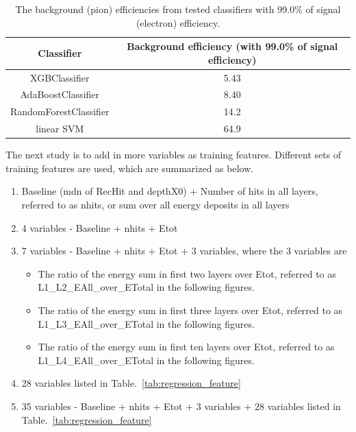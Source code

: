 \begin{table}[!ht]
  \begin{center}
    {
    \begin{tabular}{cc}
    	Classifier &  Background efficiency (with 99.0\% of signal efficiency) \\
    	\hline
    	XGBClassifier & 5.43 \\
    	AdaBoostClassifier  & 8.40 \\
    	RandomForestClassifier & 14.2 \\
    	linear SVM & 64.9 \\
    \end{tabular}
    }
  \end{center}
  \caption{The background (pion) efficiencies from tested classifiers with 99.0\% of signal (electron) efficiency.  \label{tab:ROC-summary}}
\end{table}


The next study is to add in more variables as training features. Different sets of training features are used, which are summarized as below.
\begin{enumerate}
\item Baseline (mdn of RecHit and depthX0) + Number of hits in all layers, referred to as nhits, or sum over all energy deposits in all layers
\item 4 variables - Baseline + nhits + Etot
\item 7 variables - Baseline + nhits + Etot + 3 variables, where the 3 variables are 
	\begin{itemize}
	\item The ratio of the energy sum in first two layers over Etot, referred to as \\ L1\_L2\_EAll\_over\_ETotal in the following figures.
	\item The ratio of the energy sum in first three layers over Etot, referred to as \\ L1\_L3\_EAll\_over\_ETotal in the following figures.
	\item The ratio of the energy sum in first ten layers over Etot, referred to as \\ L1\_L4\_EAll\_over\_ETotal in the following figures.
	\end{itemize}
\item 28 variables listed in Table.~\ref{tab:regression_feature}
\item 35 variables - Baseline + nhits + Etot + 3 variables + 28 variables listed in Table.~\ref{tab:regression_feature}
\end{enumerate}  

